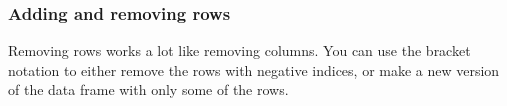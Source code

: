 \documentclass[
  13,
  letterpaper,
]{report}
\newenvironment{Shaded}{\begin{snugshade}}{\end{snugshade}}
\newcommand{\AttributeTok}[1]{\textcolor[rgb]{0.40,0.45,0.13}{#1}}
\newcommand{\CommentTok}[1]{\textcolor[rgb]{0.37,0.37,0.37}{#1}}
\newcommand{\ConstantTok}[1]{\textcolor[rgb]{0.56,0.35,0.01}{#1}}
\newcommand{\FunctionTok}[1]{\textcolor[rgb]{0.28,0.35,0.67}{#1}}
\newcommand{\NormalTok}[1]{\textcolor[rgb]{0.00,0.23,0.31}{#1}}
\newcommand{\SpecialCharTok}[1]{\textcolor[rgb]{0.37,0.37,0.37}{#1}}
\newcommand{\StringTok}[1]{\textcolor[rgb]{0.13,0.47,0.30}{#1}}
\begin{document}
\begin{Shaded}
\end{Shaded}

\subsubsection{Adding and removing rows}\label{sec-05-df-com-add}

Removing rows works a lot like removing columns. You can use the bracket
notation to either remove the rows with negative indices, or make a new
version of the data frame with only some of the rows.
\end{document}
